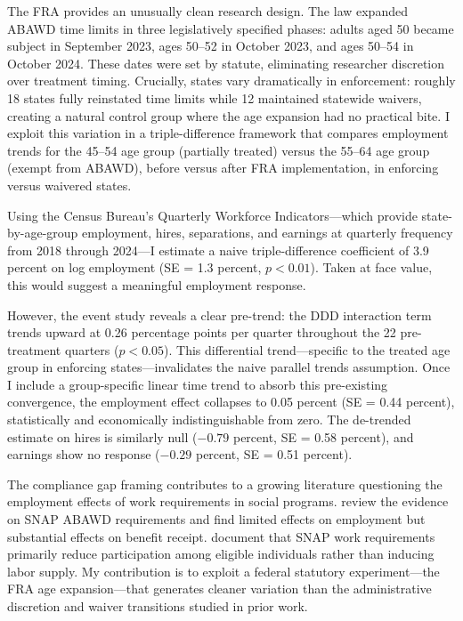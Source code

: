 \documentclass[12pt]{article}
\begin{document}
The FRA provides an unusually clean research design. The law expanded ABAWD time limits in three legislatively specified phases: adults aged 50 became subject in September 2023, ages 50--52 in October 2023, and ages 50--54 in October 2024. These dates were set by statute, eliminating researcher discretion over treatment timing. Crucially, states vary dramatically in enforcement: roughly 18 states fully reinstated time limits while 12 maintained statewide waivers, creating a natural control group where the age expansion had no practical bite. I exploit this variation in a triple-difference framework that compares employment trends for the 45--54 age group (partially treated) versus the 55--64 age group (exempt from ABAWD), before versus after FRA implementation, in enforcing versus waivered states.

Using the Census Bureau's Quarterly Workforce Indicators---which provide state-by-age-group employment, hires, separations, and earnings at quarterly frequency from 2018 through 2024---I estimate a naive triple-difference coefficient of 3.9 percent on log employment (SE = 1.3 percent, $p < 0.01$). Taken at face value, this would suggest a meaningful employment response.

However, the event study reveals a clear pre-trend: the DDD interaction term trends upward at 0.26 percentage points per quarter throughout the 22 pre-treatment quarters ($p < 0.05$). This differential trend---specific to the treated age group in enforcing states---invalidates the naive parallel trends assumption. Once I include a group-specific linear time trend to absorb this pre-existing convergence, the employment effect collapses to 0.05 percent (SE = 0.44 percent), statistically and economically indistinguishable from zero. The de-trended estimate on hires is similarly null ($-0.79$ percent, SE = 0.58 percent), and earnings show no response ($-0.29$ percent, SE = 0.51 percent).

The compliance gap framing contributes to a growing literature questioning the employment effects of work requirements in social programs. \citet{harris2023work} review the evidence on SNAP ABAWD requirements and find limited effects on employment but substantial effects on benefit receipt. \citet{gray2023losing} document that SNAP work requirements primarily reduce participation among eligible individuals rather than inducing labor supply. My contribution is to exploit a federal statutory experiment---the FRA age expansion---that generates cleaner variation than the administrative discretion and waiver transitions studied in prior work.
\end{document}
